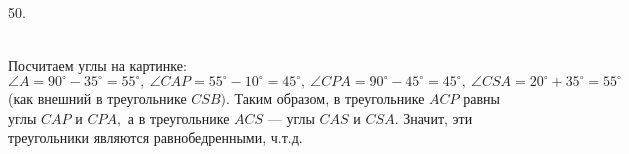 50. \begin{figure}[ht!]
\end{figure}\\
Посчитаем углы на картинке: $\angle A=90^\circ-35^\circ=55^\circ,\ \angle CAP=55^\circ-10^\circ=45^\circ,\ \angle CPA=90^\circ-45^\circ=45^\circ,\ \angle CSA=20^\circ+35^\circ=55^\circ$ (как внешний в треугольнике $CSB).$ Таким образом, в треугольнике $ACP$ равны углы $CAP$ и $CPA,$ а в треугольнике $ACS$ --- углы $CAS$ и $CSA.$ Значит, эти треугольники являются равнобедренными, ч.т.д.\\
